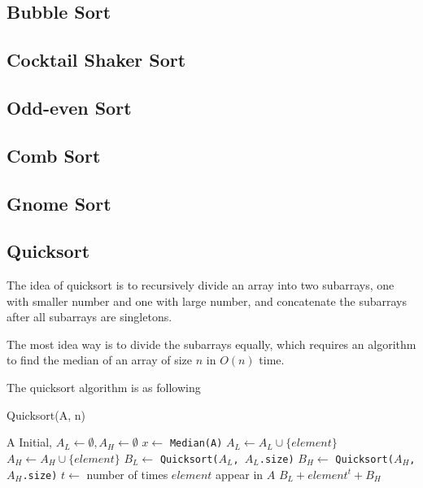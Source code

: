 			\subsection{Bubble Sort}

			\subsection{Cocktail Shaker Sort}

			\subsection{Odd-even Sort}

			\subsection{Comb Sort}

			\subsection{Gnome Sort}

			\subsection{Quicksort}
				The idea of quicksort is to recursively divide an array into two subarrays, one with smaller number and one with large number, and concatenate  the subarrays after all subarrays are singletons.

				The most idea way is to divide the subarrays equally, which requires an algorithm to find the median of an array of size $n$ in $O(n)$ time.

				The quicksort algorithm is as following
				\begin{algorithm}[h]
					\caption{Quicksort(A, n)}
					\begin{algorithmic}[1]
							\Return A
						\EndIf
						\State Initial, $A_L \gets \emptyset, A_H \gets \emptyset$
						\State $x \gets$ \texttt{Median(A)}
								\State $A_L \gets A_L \cup \{element\}$
							\Else
								\State $A_H \gets A_H \cup \{element\}$
							\EndIf
						\EndFor
						\State $B_L \gets$ \texttt{Quicksort($A_L$, $A_L$.size)}
						\State $B_H \gets$ \texttt{Quicksort($A_H$, $A_H$.size)}
						\State $t \gets$ number of times $element$ appear in $A$
						\Return $B_L + element^t + B_H$
					\end{algorithmic}
				\end{algorithm}

